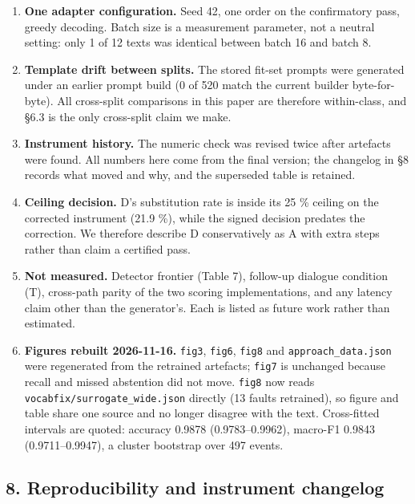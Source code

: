 \documentclass[
  10pt,
]{article}
\providecommand{\tightlist}{%
  \setlength{\itemsep}{0pt}\setlength{\parskip}{0pt}}
\begin{document}
\begin{enumerate}
\def\labelenumi{\arabic{enumi}.}
\tightlist
\item
  \textbf{One adapter configuration.} Seed 42, one order on the
  confirmatory pass, greedy decoding. Batch size is a measurement
  parameter, not a neutral setting: only 1 of 12 texts was identical
  between batch 16 and batch 8.
\item
  \textbf{Template drift between splits.} The stored fit-set prompts
  were generated under an earlier prompt build (0 of 520 match the
  current builder byte-for-byte). All cross-split comparisons in this
  paper are therefore within-class, and \S6.3 is the only cross-split
  claim we make.
\item
  \textbf{Instrument history.} The numeric check was revised twice after
  artefacts were found. All numbers here come from the final version;
  the changelog in \S8 records what moved and why, and the superseded
  table is retained.
\item
  \textbf{Ceiling decision.} D's substitution rate is inside its 25 \%
  ceiling on the corrected instrument (21.9 \%), while the signed
  decision predates the correction. We therefore describe D
  conservatively as A with extra steps rather than claim a certified
  pass.
\item
  \textbf{Not measured.} Detector frontier (Table 7), follow-up dialogue
  condition (T), cross-path parity of the two scoring implementations,
  and any latency claim other than the generator's. Each is listed as
  future work rather than estimated.
\item
  \textbf{Figures rebuilt 2026-11-16.} \texttt{fig3}, \texttt{fig6},
  \texttt{fig8} and \texttt{approach\_data.json} were regenerated from
  the retrained artefacts; \texttt{fig7} is unchanged because recall and
  missed abstention did not move. \texttt{fig8} now reads
  \texttt{vocabfix/\allowbreak{}surrogate\_\allowbreak{}wide.json} directly (13 faults retrained),
  so figure and table share one source and no longer disagree with the
  text. Cross-fitted intervals are quoted: accuracy 0.9878
  (0.9783--0.9962), macro-F1 0.9843 (0.9711--0.9947), a cluster
  bootstrap over 497 events.
\end{enumerate}

\subsection{8. Reproducibility and instrument
changelog}\label{reproducibility-and-instrument-changelog}
\end{document}
